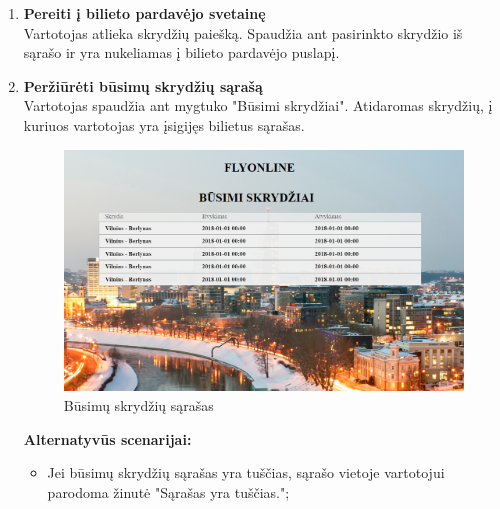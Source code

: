\documentclass{VUMIFPSkursinis}
\begin{document}
\begin{enumerate}[label=\textbf{U\arabic*}.]
                    \item \textbf{Pereiti į bilieto pardavėjo svetainę}\\
                    Vartotojas atlieka skrydžių paiešką. Spaudžia ant pasirinkto skrydžio iš sąrašo ir yra nukeliamas į bilieto pardavėjo puslapį.

                    \item \textbf{Peržiūrėti būsimų skrydžių sąrašą}\\
                    Vartotojas spaudžia ant mygtuko "Būsimi skrydžiai". Atidaromas skrydžių, į kuriuos vartotojas yra įsigijęs bilietus sąrašas.
                    \begin{figure}[H]	
                        \centering
                        \includegraphics[scale=0.4]{img/history}	
                        \caption{Būsimų skrydžių sąrašas}	
                        \label{Būsimų skrydžių sąrašas}	
                    \end{figure}
                    \textbf{Alternatyvūs scenarijai:}
                    \begin{itemize}
                        \item Jei būsimų skrydžių sąrašas yra tuščias, sąrašo vietoje vartotojui parodoma žinutė "Sąrašas yra tuščias.";
                    \end{itemize}


\end{enumerate}
\end{document}
